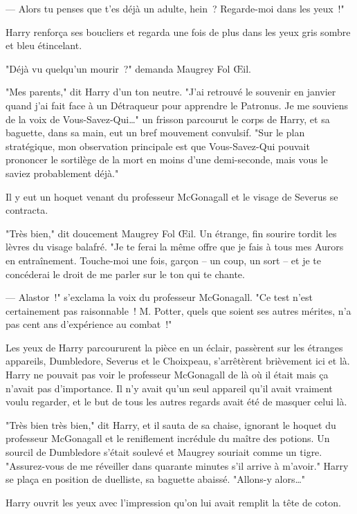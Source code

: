 --- Alors tu penses que t'es déjà un adulte, hein~? Regarde-moi dans les yeux~!"

Harry renforça ses boucliers et regarda une fois de plus dans les yeux gris sombre et bleu étincelant.

"Déjà vu quelqu'un mourir~?" demanda Maugrey Fol Œil.

"Mes parents," dit Harry d'un ton neutre. "J'ai retrouvé le souvenir en janvier quand j'ai fait face à un Détraqueur pour apprendre le Patronus. Je me souviens de la voix de Vous-Savez-Qui…" un frisson parcourut le corps de Harry, et sa baguette, dans sa main, eut un bref mouvement convulsif. "Sur le plan stratégique, mon observation principale est que Vous-Savez-Qui pouvait prononcer le sortilège de la mort en moins d'une demi-seconde, mais vous le saviez probablement déjà."

Il y eut un hoquet venant du professeur McGonagall et le visage de Severus se contracta.

"Très bien," dit doucement Maugrey Fol Œil. Un étrange, fin sourire tordit les lèvres du visage balafré. "Je te ferai la même offre que je fais à tous mes Aurors en entraînement. Touche-moi une fois, garçon -- un coup, un sort -- et je te concéderai le droit de me parler sur le ton qui te chante.

--- Alastor~!" s'exclama la voix du professeur McGonagall. "Ce test n'est certainement pas raisonnable~! M. Potter, quels que soient ses autres mérites, n'a pas cent ans d'expérience au combat~!"

Les yeux de Harry parcoururent la pièce en un éclair, passèrent sur les étranges appareils, Dumbledore, Severus et le Choixpeau, s'arrêtèrent brièvement ici et là. Harry ne pouvait pas voir le professeur McGonagall de là où il était mais ça n'avait pas d'importance. Il n'y avait qu'un seul appareil qu'il avait vraiment voulu regarder, et le but de tous les autres regards avait été de masquer celui là.

"Très bien très bien," dit Harry, et il sauta de sa chaise, ignorant le hoquet du professeur McGonagall et le reniflement incrédule du maître des potions. Un sourcil de Dumbledore s'était soulevé et Maugrey souriait comme un tigre. "Assurez-vous de me réveiller dans quarante minutes s'il arrive à m'avoir." Harry se plaça en position de duelliste, sa baguette abaissé. "Allons-y alors…"

\later

Harry ouvrit les yeux avec l'impression qu'on lui avait remplit la tête de coton.

